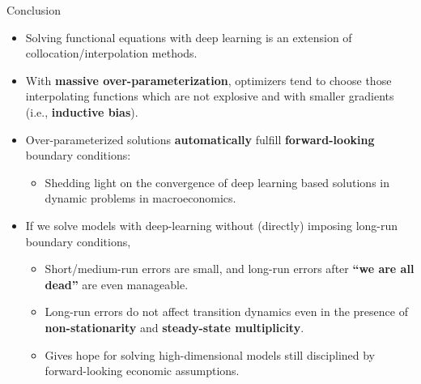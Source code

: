 \documentclass[aspectratio=169,10pt]{beamer}
\newcommand{\emphcolor}[1]{\textbf{\textcolor{emphcolorval}{#1}}}
\begin{document}
\begin{frame}{Conclusion}
	
	\begin{itemize}
		\item Solving functional equations with deep learning is an extension of collocation/interpolation methods.\vspace{0.1in}
		\item With \emphcolor{massive over-parameterization}, optimizers tend to choose those interpolating functions which are not explosive and with smaller gradients (i.e., \emphcolor{inductive bias}).\vspace{0.1in}
		\item Over-parameterized solutions \emphcolor{automatically} fulfill \emphcolor{forward-looking} boundary conditions:			\smallskip
		\begin{itemize}
			\item Shedding light on the convergence of deep learning based solutions in dynamic problems in macroeconomics.	
		\end{itemize}\vspace{0.1in}
		
		\item If we solve models with deep-learning without (directly) imposing long-run boundary conditions,			\smallskip
		\begin{itemize}
			\item Short/medium-run errors are small, and long-run errors after \emphcolor{``we are all dead''} are even manageable.\smallskip
			\item Long-run errors do not affect transition dynamics even in the presence  of \emphcolor{non-stationarity} and \emphcolor{steady-state multiplicity}.			\smallskip
			\item Gives hope for solving high-dimensional models still disciplined by forward-looking economic assumptions.
		\end{itemize}\vspace{0.1in}
		
		\end{itemize}
		
	\end{frame}
\end{document}
